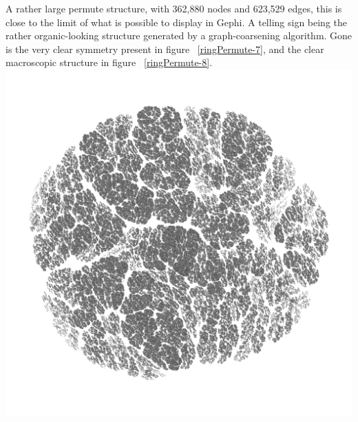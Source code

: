 \documentclass[12pt]{article}
\begin{document}
\label{Appendix A}
A rather large permute structure, with 362,880 nodes and 623,529 edges, this is close to the limit of what is possible to display in Gephi.
A telling sign being the rather organic-looking structure generated by a graph-coarsening algorithm.
Gone is the very clear symmetry present in figure ~\ref{ringPermute-7}, and the clear macroscopic structure in figure ~\ref{ringPermute-8}.\\
\hspace{0.5cm}
\centering
\includegraphics[scale=0.45]{Graphs/9-permute1024.png}
\end{document}
